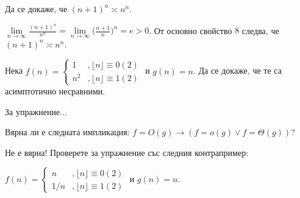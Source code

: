 \begin{problem}
	Да се докаже, че $(n+1)^n\asymp n^n$.
\end{problem}
\begin{solution}
	$\lim\limits_{n\to\infty}\frac{(n+1)^n}{n^n}=\lim\limits_{n\to\infty}\big(\frac{n+1}n\big)^n=e>0$.
	От основно свойство $\hyperref[mprop-1]{8}$ следва, че $(n+1)^n\asymp n^n$.
\end{solution}\leavevmode\newline

\begin{problem}
	Нека $f(n)=\begin{cases}
	1&,\lfloor n\rfloor\equiv0(2)\\
	n^2&,\lfloor n\rfloor\equiv1(2)
	\end{cases}$ и $g(n)=n$. Да се докаже, че те са асимптотично несравними.
\end{problem}
\begin{solution}
	За упражнение...
\end{solution}\leavevmode\newline

\begin{problem}
	Вярна ли е следната импликация: $f=O(g)\rightarrow(f=o(g)\lor f=\Theta(g))$?
\end{problem}
\begin{solution}
	Не е вярна!	Проверете за упражнение със следния контрапример:
	
	\noindent
	$f(n)=\begin{cases}
	n&,\lfloor n\rfloor\equiv0(2)\\
	1/n&,\lfloor n\rfloor\equiv1(2)
	\end{cases}$ и $g(n)=n$.
\end{solution}\leavevmode\newline

